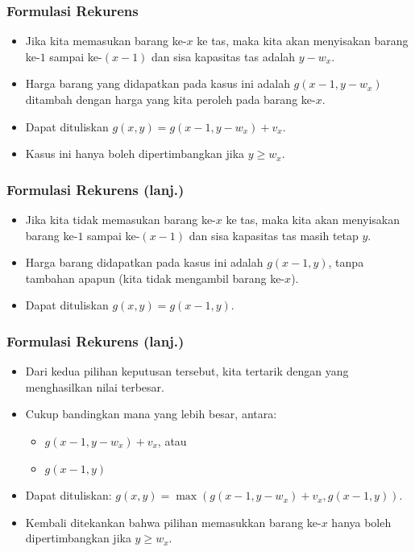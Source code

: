 \begin{frame} 
\frametitle{Formulasi Rekurens}
\begin{itemize}
  \item Jika kita memasukan barang ke-$x$ ke tas, maka kita akan menyisakan barang ke-$1$ sampai ke-$(x-1)$ dan sisa kapasitas tas adalah $y-w_x$. 
  \item Harga barang yang didapatkan pada kasus ini adalah $g(x-1,y-w_x)$ ditambah dengan harga yang kita peroleh pada barang ke-$x$.
  \item Dapat dituliskan $g(x, y) = g(x-1, y-w_x) + v_x$.
  \item Kasus ini hanya boleh dipertimbangkan jika $y \geq w_x$.
\end{itemize}
\end{frame}

\begin{frame} 
\frametitle{Formulasi Rekurens (lanj.)}
\begin{itemize}
  \item Jika kita tidak memasukan barang ke-$x$ ke tas, maka kita akan menyisakan barang ke-$1$ sampai ke-$(x-1)$ dan sisa kapasitas tas masih tetap $y$.
  \item Harga barang didapatkan pada kasus ini adalah $g(x-1,y)$, tanpa tambahan apapun (kita tidak mengambil barang ke-$x$).
  \item Dapat dituliskan $g(x, y) = g(x-1, y)$.
\end{itemize}
\end{frame}

\begin{frame} 
\frametitle{Formulasi Rekurens (lanj.)}
\begin{itemize}
  \item Dari kedua pilihan keputusan tersebut, kita tertarik dengan yang menghasilkan nilai terbesar.
  \item Cukup bandingkan mana yang lebih besar, antara:
  \begin{itemize}
    \item $g(x-1, y-w_x) + v_x$, atau
    \item $g(x-1, y)$
  \end{itemize}
  \item Dapat dituliskan: $g(x, y) = \max(g(x-1,y-w_x)+v_x,g(x-1,y))$. \newline
  \item Kembali ditekankan bahwa pilihan memasukkan barang ke-$x$ hanya boleh dipertimbangkan jika $y \geq w_x$.
\end{itemize}
\end{frame}


